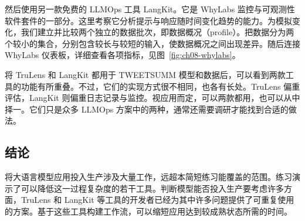 然后使用另一款免费的 LLMOps 工具 LangKit。它是 WhyLabs 监控与可观测性软件套件的一部分。这里考察它分析提示与响应随时间变化趋势的能力。为模拟变化，我们建立并比较两个独立的数据批次，即数据概况（profile）。把数据分为两个较小的集合，分别包含较长与较短的输入，使数据概况之间出现差异。随后连接 WhyLabs 仪表板，详细查看各项指标，见图~\ref{fig:ch08-whylabs}。


将 TruLens 和 LangKit 都用于 TWEETSUMM 模型和数据后，可以看到两款工具的功能有所重叠。不过，它们的实现方式很不相同，也各有长处。TruLens 偏重评估，LangKit 则偏重日志记录与监控。视应用而定，可以两款都用，也可以从中择一。它们只是众多 LLMOps 方案中的两种，通常还需要调研才能找到合适的做法。

\subsection{结论}
将大语言模型应用投入生产涉及大量工作，远超本简短练习能覆盖的范围。练习演示了可以降低这一过程复杂度的若干工具。判断模型能否投入生产要考虑许多方面，TruLens 和 LangKit 等工具的开发者已经为其中许多问题提供了可重复使用的方案。基于这些工具构建工作流，可以缩短应用达到较成熟状态所需的时间。
